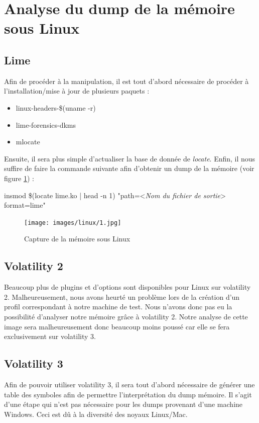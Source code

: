 \documentclass[a4paper]{article}
\begin{document}
\section{Analyse du dump de la mémoire sous Linux}
\subsection{Lime}
Afin de procéder à la manipulation, il est tout d'abord nécessaire de procéder à l'installation/mise à jour de plusieurs paquets :
\begin{itemize}
    \item linux-headers-\$(uname -r)
    \item lime-forensics-dkms
    \item mlocate
\end{itemize}
Ensuite, il sera plus simple d'actualiser la base de donnée de \emph{locate}.
Enfin, il nous suffire de faire la commande suivante afin d'obtenir un dump de la mémoire (voir figure \ref{fig:captureLinux}) :
\begin{example}
    insmod \$(locate lime.ko | head -n 1) "path=<\emph{Nom du fichier de sortie}> format=lime"
\end{example}
\begin{figure}[H]
    \centering
    \texttt{[image: images/linux/1.jpg]}
    \caption{Capture de la mémoire sous Linux}
    \label{fig:captureLinux}
\end{figure}

\subsection{Volatility 2}
Beaucoup plus de plugins et d'options sont disponibles pour Linux sur volatility 2. Malheureusement, nous avons heurté un problème lors de la création d'un profil correspondant à notre machine de test. Nous n'avons donc pas eu la possibilité d'analyser notre mémoire grâce à volatility 2. Notre analyse de cette image sera malheureusement donc beaucoup moins poussé car elle se fera exclusivement sur volatility 3.

\subsection{Volatility 3}

Afin de pouvoir utiliser volatility 3, il sera tout d'abord nécessaire de générer une table des symboles afin de permettre l'interprétation du dump mémoire. Il s'agit d'une étape qui n'est pas nécessaire pour les dumps provenant d'une machine Windows. Ceci est dû à la diversité des noyaux Linux/Mac.\\\\
\end{document}
